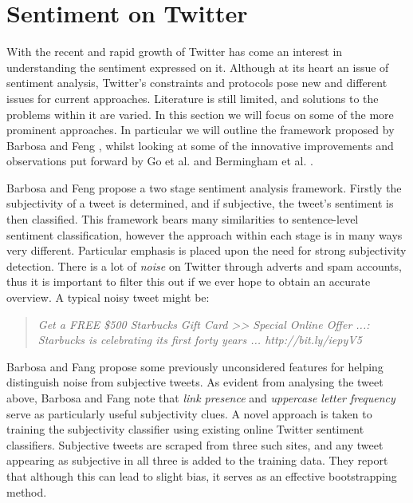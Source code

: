 \section{Sentiment on Twitter}
\label{background:sentiment_on_twitter}

With the recent and rapid growth of Twitter has come an interest in understanding the sentiment expressed on it. Although at its heart an issue of sentiment analysis, Twitter's constraints and protocols pose new and different issues for current approaches. Literature is still limited, and solutions to the problems within it are varied. In this section we will focus on some of the more prominent approaches. In particular we will outline the framework proposed by Barbosa and Feng \cite{Barbosa:ws}, whilst looking at some of the innovative improvements and observations put forward by Go et al. \cite{Go:2009ut} and Bermingham et al. \cite{Bermingham:2010vh}.

Barbosa and Feng \cite{Barbosa:ws} propose a two stage sentiment analysis framework. Firstly the subjectivity of a tweet is determined, and if subjective, the tweet's sentiment is then classified. This framework bears many similarities to sentence-level sentiment classification, however the approach within each stage is in many ways very different. Particular emphasis is placed upon the need for strong subjectivity detection. There is a lot of \emph{noise} on Twitter through adverts and spam accounts, thus it is important to filter this out if we ever hope to obtain an accurate overview. A typical noisy tweet might be:

\begin{quote}
	\emph{Get a FREE \$500 Starbucks Gift Card >> Special Online Offer ...: Starbucks is celebrating its first forty years ... http://bit.ly/iepyV5}
\end{quote}

Barbosa and Fang propose some previously unconsidered features for helping distinguish noise from subjective tweets. As evident from analysing the tweet above, Barbosa and Fang note that \emph{link presence} and \emph{uppercase letter frequency} serve as particularly useful subjectivity clues. A novel approach is taken to training the subjectivity classifier using existing online Twitter sentiment classifiers. Subjective tweets are scraped from three such sites, and any tweet appearing as subjective in all three is added to the training data. They report that although this can lead to slight bias, it serves as an effective bootstrapping method. 

